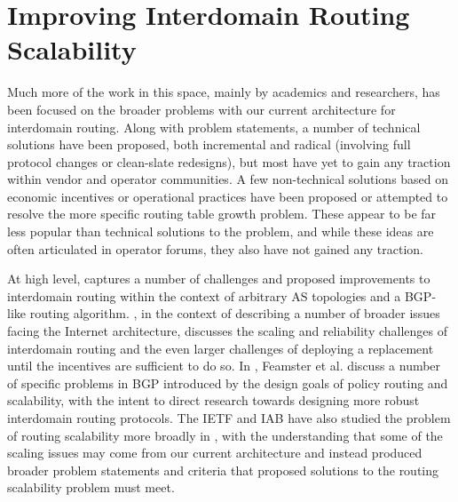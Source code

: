 \section{Improving Interdomain Routing Scalability}

Much more of the work in this space, mainly by academics and researchers, has been focused on the broader problems with our current architecture for interdomain routing. Along with problem statements, a number of technical solutions have been proposed, both incremental and radical (involving full protocol changes or clean-slate redesigns), but most have yet to gain any traction within vendor and operator communities. A few non-technical solutions based on economic incentives or operational practices have been proposed or attempted to resolve the more specific routing table growth problem. These appear to be far less popular than technical solutions to the problem, and while these ideas are often articulated in operator forums, they also have not gained any traction.

At high level, \cite{Yannuzzi:2005hc} captures a number of challenges and proposed improvements to interdomain routing within the context of arbitrary AS topologies and a BGP-like routing algorithm. \cite{Handley:2006kx}, in the context of describing a number of broader issues facing the Internet architecture, discusses the scaling and reliability challenges of interdomain routing and the even larger challenges of deploying a replacement until the incentives are sufficient to do so. In \cite{Feamster:2004nx}, Feamster et al. discuss a number of specific problems in BGP introduced by the design goals of policy routing and scalability, with the intent to direct research towards designing more robust interdomain routing protocols. The IETF and IAB have also studied the problem of routing scalability more broadly in \cite{rfc4984}, with the understanding that some of the scaling issues may come from our current architecture and instead produced broader problem statements and criteria that proposed solutions to the routing scalability problem must meet.

